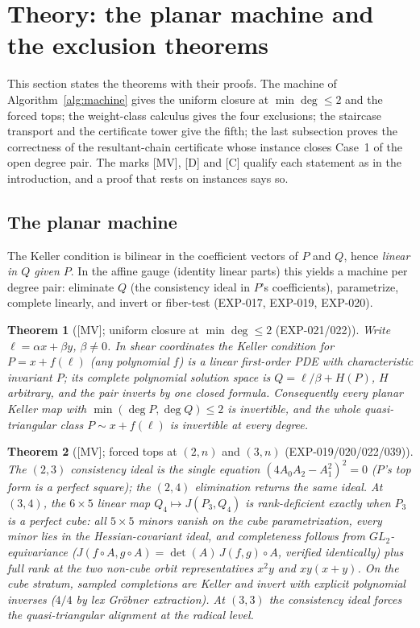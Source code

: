 \documentclass[11pt]{article}
\newtheorem{theorem}{Theorem}[section]
\theoremstyle{remark}
\begin{document}
\section{Theory: the planar machine and the exclusion theorems}\label{sec:theory}

This section states the theorems with their proofs. The machine of Algorithm~\ref{alg:machine} gives the uniform closure at
$\min\deg\le2$ and the forced tops; the weight-class calculus gives the four exclusions; the staircase transport and the certificate tower
give the fifth; the last subsection proves the correctness of the resultant-chain certificate whose instance closes Case~1 of the open degree pair. The marks [MV], [D] and [C] qualify each statement as in the introduction, and a proof that rests on instances says so.

\subsection{The planar machine}\label{sec:machine}

The Keller condition is bilinear in the coefficient vectors of $P$ and $Q$, hence
\emph{linear in $Q$ given $P$}. In the affine gauge (identity linear parts) this yields a
machine per degree pair: eliminate $Q$ (the consistency ideal in $P$'s coefficients),
parametrize, complete linearly, and invert or fiber-test (EXP-017, EXP-019, EXP-020).

\begin{theorem}[{[MV]}; uniform closure at $\min\deg \le 2$ (EXP-021/022)]\label{thm:uniform}
Write $\ell = \alpha x + \beta y$, $\beta \ne 0$. In shear coordinates the Keller condition
for $P = x + f(\ell)$ (any polynomial $f$) is a linear first-order PDE with characteristic
invariant $P$; its complete polynomial solution space is $Q = \ell/\beta + H(P)$, $H$
arbitrary, and the pair inverts by one closed formula. Consequently every planar Keller map
with $\min(\deg P, \deg Q) \le 2$ is invertible, and the whole quasi-triangular class
$P \sim x + f(\ell)$ is invertible at every degree.
\end{theorem}

\begin{theorem}[{[MV]}; forced tops at $(2, n)$ and $(3, n)$ (EXP-019/020/022/039)]
\label{thm:forced}
The $(2,3)$ consistency ideal is the single equation $(4A_0A_2 - A_1^2)^2 = 0$ ($P$'s top
form is a perfect square); the $(2,4)$ elimination returns the same ideal. At $(3, 4)$, the
$6 \times 5$ linear map $Q_4 \mapsto J(P_3, Q_4)$ is rank-deficient exactly when $P_3$ is a
perfect cube: all $5 \times 5$ minors vanish on the cube parametrization, every minor lies in
the Hessian-covariant ideal, and completeness follows from $GL_2$-equivariance
($J(f \circ A, g \circ A) = \det(A)\, J(f, g) \circ A$, verified identically) plus full rank
at the two non-cube orbit representatives $x^2 y$ and $x y (x + y)$. On the cube stratum,
sampled completions are Keller and invert with explicit polynomial inverses ($4/4$ by lex
Gr\"obner extraction). At $(3,3)$ the consistency ideal forces the quasi-triangular alignment
at the radical level.
\end{theorem}
\end{document}
